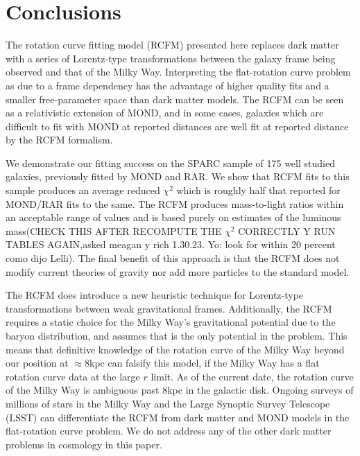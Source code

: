\documentclass[reprint,%
 amsmath,amssymb,
 aps,
]{revtex4-1}
\begin{document}
 



 
 \section{  Conclusions \label{sec:conclu}  }
 

The   rotation curve fitting model (RCFM) presented here      replaces dark matter with a series of  Lorentz-type transformations between  the  galaxy frame being observed and that of the Milky Way. 
Interpreting the flat-rotation curve problem as due to a  frame dependency has the advantage of higher quality fits and a smaller free-parameter space than dark matter models. The RCFM can be seen as a   relativistic extension of MOND, and in some cases,  galaxies which are difficult to fit with MOND at reported distances are well fit at reported distance by  the RCFM formalism.
 
  We demonstrate our fitting success on the SPARC sample of   175  well studied galaxies\cite{2016Lelli}, previously fitted by MOND and RAR. 
We   show   that RCFM fits to this sample   produces an average reduced $\chi^2$  which is roughly half that reported for MOND/RAR fits to the same.  
The RCFM produces mass-to-light ratios within an acceptable range of values   and is based purely  on estimates of the luminous mass{\color{blue}(CHECK THIS AFTER RECOMPUTE THE $\chi^2$ CORRECTLY Y RUN TABLES AGAIN,asked meagan y rich 1.30.23. Yo:  look for within 20 percent como dijo Lelli)}.  The final benefit of this approach  is that the RCFM does not modify current theories of gravity nor add more particles to the standard model. 

The RCFM     does   introduce a new heuristic technique for Lorentz-type transformations between  weak gravitational frames.  Additionally,   the RCFM  requires a static choice for the Milky Way's  gravitational potential due to the baryon distribution, and assumes that is the only potential in the problem. 
This   means that definitive knowledge of the rotation curve of the  Milky Way beyond our position at $\approx 8$kpc  can   falsify this model, if the Milky Way has a flat rotation curve data at the large $r$ limit. 
  As of the current date, the rotation curve of the Milky Way  is ambiguous  past  $8$kpc  in 
  the galactic disk.   
Ongoing    surveys of millions of  stars in the Milky Way
 \cite{2022ApJS..259...35A,2010ApJ...716....1B,de_Blok_2010} and the Large Synoptic Survey Telescope (LSST)  \citet{Ivezić_2019} can 
  differentiate the RCFM from dark matter and MOND models in the flat-rotation curve problem. We do not address any of the other dark matter problems in cosmology in this paper. 
  
\end{document}
